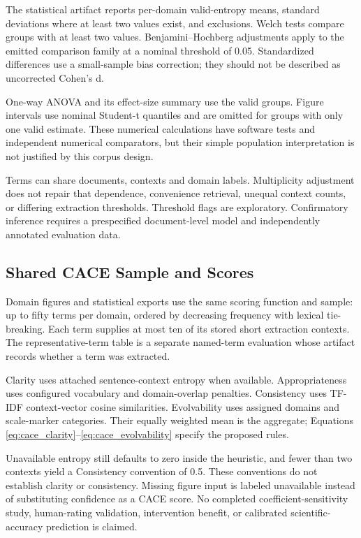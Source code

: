 \documentclass[
]{article}
\numberwithin{equation}{section}
\begin{document}
The statistical artifact reports per-domain valid-entropy means,
standard deviations where at least two values exist, and exclusions.
Welch tests compare groups with at least two values. Benjamini--Hochberg
adjustments apply to the emitted comparison family at a nominal
threshold of 0.05. Standardized differences use a small-sample bias
correction; they should not be described as uncorrected Cohen's d.

One-way ANOVA and its effect-size summary use the valid groups. Figure
intervals use nominal Student-t quantiles and are omitted for groups
with only one valid estimate. These numerical calculations have software
tests and independent numerical comparators, but their simple population
interpretation is not justified by this corpus design.

Terms can share documents, contexts and domain labels. Multiplicity
adjustment does not repair that dependence, convenience retrieval,
unequal context counts, or differing extraction thresholds. Threshold
flags are exploratory. Confirmatory inference requires a prespecified
document-level model and independently annotated evaluation data.

\subsection{Shared CACE Sample and
Scores}\label{shared-cace-sample-and-scores}

Domain figures and statistical exports use the same scoring function and
sample: up to fifty terms per domain, ordered by decreasing frequency
with lexical tie-breaking. Each term supplies at most ten of its stored
short extraction contexts. The representative-term table is a separate
named-term evaluation whose artifact records whether a term was
extracted.

Clarity uses attached sentence-context entropy when available.
Appropriateness uses configured vocabulary and domain-overlap penalties.
Consistency uses TF-IDF context-vector cosine similarities. Evolvability
uses assigned domains and scale-marker categories. Their equally
weighted mean is the aggregate; Equations
\ref{eq:cace_clarity}--\ref{eq:cace_evolvability} specify the proposed
rules.

Unavailable entropy still defaults to zero inside the heuristic, and
fewer than two contexts yield a Consistency convention of 0.5. These
conventions do not establish clarity or consistency. Missing figure
input is labeled unavailable instead of substituting confidence as a
CACE score. No completed coefficient-sensitivity study, human-rating
validation, intervention benefit, or calibrated scientific-accuracy
prediction is claimed.
\end{document}
